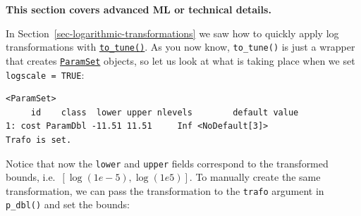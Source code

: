 \begin{tcolorbox}[enhanced jigsaw, colframe=quarto-callout-note-color-frame, rightrule=.15mm, bottomrule=.15mm, toprule=.15mm, opacityback=0, colback=white, left=2mm, arc=.35mm, breakable, leftrule=.75mm]
\begin{minipage}[t]{5.5mm}
\textcolor{quarto-callout-note-color}{\faInfo}
\end{minipage}%
\begin{minipage}[t]{\textwidth - 5.5mm}

\textbf{This section covers advanced ML or technical
details.}\vspace{2mm}

\end{minipage}%
\end{tcolorbox}

In Section~\ref{sec-logarithmic-transformations} we saw how to quickly
apply log transformations with
\href{https://paradox.mlr-org.com/reference/to_tune.html}{\texttt{to\_tune()}}.
As you now know, \texttt{to\_tune()} is just a wrapper that creates
\href{https://paradox.mlr-org.com/reference/ParamSet.html}{\texttt{ParamSet}}
objects, so let us look at what is taking place when we set
\texttt{logscale\ =\ TRUE}:

\begin{Shaded}
\begin{Highlighting}[]
\NormalTok{(}\NormalTok{, } \NormalTok{(}\NormalTok{, }\NormalTok{, } \NormalTok{))}\SpecialCharTok{$}
\SpecialCharTok{$}\NormalTok{()}
\end{Highlighting}
\end{Shaded}

\begin{verbatim}
<ParamSet>
     id    class  lower upper nlevels        default value
1: cost ParamDbl -11.51 11.51     Inf <NoDefault[3]>      
Trafo is set.
\end{verbatim}

Notice that now the \texttt{lower} and \texttt{upper} fields correspond
to the transformed bounds, i.e.~\([\log(1e-5), \log(1e5)]\). To manually
create the same transformation, we can pass the transformation to the
\texttt{trafo} argument in \texttt{p\_dbl()} and set the bounds:

\begin{Shaded}
\begin{Highlighting}[]
\OtherTok{=} \NormalTok{(} \NormalTok{(}\NormalTok{(}\NormalTok{), }\NormalTok{(}\NormalTok{),}
   
\end{Highlighting}
\end{Shaded}

